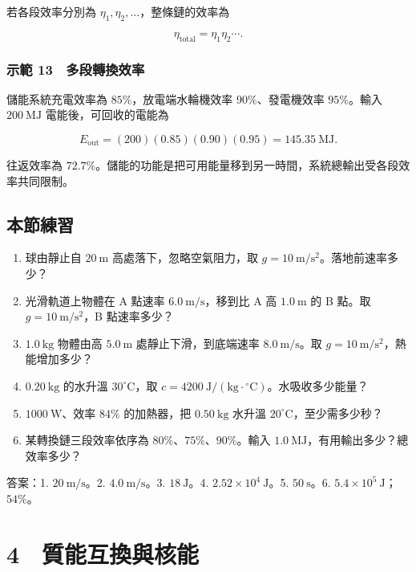 \documentclass[11pt,a4paper]{article}
\providecommand{\tightlist}{%
  \setlength{\itemsep}{0pt}\setlength{\parskip}{0pt}}
\begin{document}
若各段效率分別為 \(\eta_1,\eta_2,\ldots\)，整條鏈的效率為

\[
\eta_{\mathrm{total}}=\eta_1\eta_2\cdots.
\]

\subsubsection{示範 13　多段轉換效率}\label{ux793aux7bc4-13-ux591aux6bb5ux8f49ux63dbux6548ux7387}

儲能系統充電效率為 \(85\%\)，放電端水輪機效率 \(90\%\)、發電機效率 \(95\%\)。輸入 \(200\ \mathrm{MJ}\) 電能後，可回收的電能為

\[
E_{\mathrm{out}}=(200)(0.85)(0.90)(0.95)
=145.35\ \mathrm{MJ}.
\]

往返效率為 \(72.7\%\)。儲能的功能是把可用能量移到另一時間，系統總輸出受各段效率共同限制。

\subsection{本節練習}\label{ux672cux7bc0ux7df4ux7fd2-2}

\begin{enumerate}
\def\labelenumi{\arabic{enumi}.}
\tightlist
\item
  球由靜止自 \(20\ \mathrm m\) 高處落下，忽略空氣阻力，取 \(g=10\ \mathrm{m/s^2}\)。落地前速率多少？
\item
  光滑軌道上物體在 A 點速率 \(6.0\ \mathrm{m/s}\)，移到比 A 高 \(1.0\ \mathrm m\) 的 B 點。取 \(g=10\ \mathrm{m/s^2}\)，B 點速率多少？
\item
  \(1.0\ \mathrm{kg}\) 物體由高 \(5.0\ \mathrm m\) 處靜止下滑，到底端速率 \(8.0\ \mathrm{m/s}\)。取 \(g=10\ \mathrm{m/s^2}\)，熱能增加多少？
\item
  \(0.20\ \mathrm{kg}\) 的水升溫 \(30^\circ\mathrm C\)，取 \(c=4200\ \mathrm{J/(kg\cdot{}^\circ C)}\)。水吸收多少能量？
\item
  \(1000\ \mathrm W\)、效率 \(84\%\) 的加熱器，把 \(0.50\ \mathrm{kg}\) 水升溫 \(20^\circ\mathrm C\)，至少需多少秒？
\item
  某轉換鏈三段效率依序為 \(80\%\)、\(75\%\)、\(90\%\)。輸入 \(1.0\ \mathrm{MJ}\)，有用輸出多少？總效率多少？
\end{enumerate}

答案：1. \(20\ \mathrm{m/s}\)。2. \(4.0\ \mathrm{m/s}\)。3. \(18\ \mathrm J\)。4. \(2.52\times10^4\ \mathrm J\)。5. \(50\ \mathrm s\)。6. \(5.4\times10^5\ \mathrm J\)；\(54\%\)。

\section{4　質能互換與核能}\label{ux8ceaux80fdux4e92ux63dbux8207ux6838ux80fd}
\end{document}
